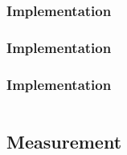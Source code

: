 \documentclass{beamer}
\begin{document}
\begin{frame}[fragile]
  \frametitle{Implementation}
  \scalebox{.40}{
  
  }
\end{frame}

\begin{frame}[fragile]
  \frametitle{Implementation}
  \begin{tiny}
  
  \end{tiny}
\end{frame}

\begin{frame}[fragile]
  \frametitle{Implementation}
  \begin{tiny}
  \begin{columns}[T]
  \begin{column}{.48\textwidth}
  \begin{center}
  
  \end{center}
  \end{column}
  \vrule{}
  \begin{column}{.48\textwidth}
  \begin{center}
  
  \end{center}
  \end{column}
  \end{columns}
  \end{tiny}
\end{frame}

\subsection{Measurement}
\end{document}
